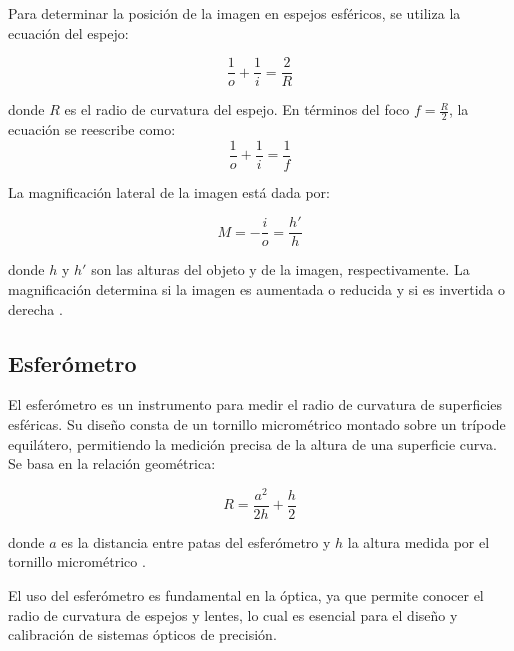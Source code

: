 \documentclass[article,12pt]{elsarticle}
\begin{document}
Para determinar la posición de la imagen en espejos esféricos, se utiliza la ecuación del espejo:

\begin{mdframed}
\begin{equation}
    \frac{1}{o} + \frac{1}{i} = \frac{2}{R}
\end{equation}
\end{mdframed}
\begin{mdframed}
donde $R$ es el radio de curvatura del espejo. En términos del foco $f = \frac{R}{2}$, la ecuación se reescribe como:
\begin{equation}
    \frac{1}{o} + \frac{1}{i} = \frac{1}{f}
\end{equation}
\end{mdframed}

La magnificación lateral de la imagen está dada por:

\begin{mdframed}
\begin{equation}
    M = -\frac{i}{o} = \frac{h'}{h}
\end{equation}
\end{mdframed}
donde $h$ y $h'$ son las alturas del objeto y de la imagen, respectivamente. La magnificación determina si la imagen es aumentada o reducida y si es invertida o derecha \cite{Serway2002}.

\subsection{Esferómetro}
El esferómetro es un instrumento para medir el radio de curvatura de superficies esféricas. Su diseño consta de un tornillo micrométrico montado sobre un trípode equilátero, permitiendo la medición precisa de la altura de una superficie curva. Se basa en la relación geométrica:

\begin{mdframed}
\begin{equation}
    R = \frac{a^2}{2h} + \frac{h}{2}
\end{equation}
\end{mdframed}

donde $a$ es la distancia entre patas del esferómetro y $h$ la altura medida por el tornillo micrométrico \cite{Khan2015}.

El uso del esferómetro es fundamental en la óptica, ya que permite conocer el radio de curvatura de espejos y lentes, lo cual es esencial para el diseño y calibración de sistemas ópticos de precisión.
\end{document}
